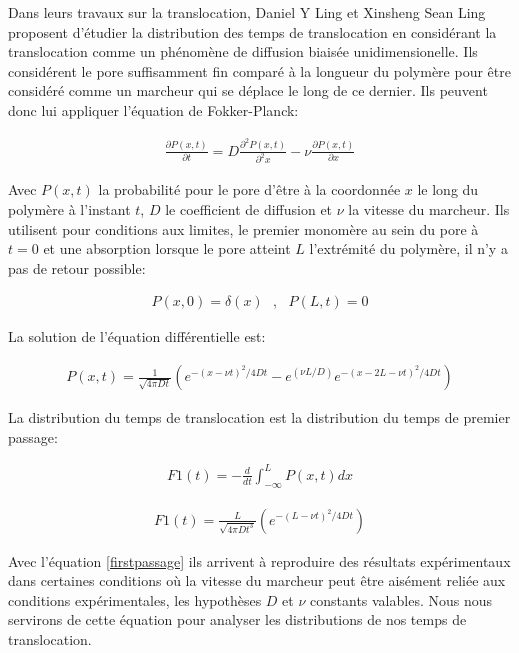\documentclass[a4paper,11pt]{article}
\begin{document}
Dans leurs travaux sur la translocation, Daniel Y Ling et Xinsheng Sean Ling \cite{Ling2013} proposent d'étudier la distribution des temps de translocation en considérant la translocation comme un phénomène de diffusion biaisée unidimensionelle. Ils considérent le pore suffisamment fin comparé à la longueur du polymère pour être considéré comme un marcheur qui se déplace le long de ce dernier. Ils peuvent donc lui appliquer l'équation de Fokker-Planck:

\begin{eqnarray}
\frac{\partial P(x,t)}{\partial t} =   D\frac{\partial ^2 P(x,t)}{\partial ^2 x} - \nu \frac{\partial  P(x,t)}{\partial  x}
\label{equfokkerplank}
\end{eqnarray}

Avec $P(x,t)$ la probabilité pour le pore d'être à la coordonnée $x$ le long du polymère à l'instant $t$, $D$ le coefficient de diffusion et $\nu$ la vitesse du marcheur. Ils utilisent pour conditions aux limites, le premier monomère au sein du pore à $t=0$ et une absorption lorsque le pore atteint $L$ l'extrémité du polymère, il n'y a pas de retour possible:

\begin{eqnarray}
 P(x,0) =   \delta(x)\text{  }, \text{  } P(L,t)=0
\label{condlim}
\end{eqnarray}

La solution de l'équation différentielle est:

\begin{eqnarray}
 P(x,t) = \frac{1}{\sqrt{4\pi D t}} \left(e^{-\left(x-\nu t\right)^{2}/4Dt} -e^{(\nu L/D)}e^{-\left(x-2L-\nu t\right)^{2}/4Dt} \right)
\label{equfokkerplanksol}
\end{eqnarray}

La distribution du temps de translocation est la distribution du temps de premier passage:

\begin{eqnarray}
 F1(t) = -\frac{d}{dt}\int_{-\infty}^L  P(x,t) dx
\label{firstpassageint}
\end{eqnarray}

\begin{eqnarray}
 F1(t) = \frac{L}{\sqrt{4\pi D t^3}} \left(e^{-\left(L-\nu t\right)^{2}/4Dt}\right)
\label{firstpassage}
\end{eqnarray}

Avec l'équation \ref{firstpassage} ils arrivent à reproduire des résultats expérimentaux dans certaines conditions où la vitesse du marcheur peut être aisément reliée aux conditions expérimentales, les hypothèses $D$ et $\nu$ constants valables. Nous nous servirons de cette équation pour analyser les distributions de nos temps de translocation.
\end{document}
